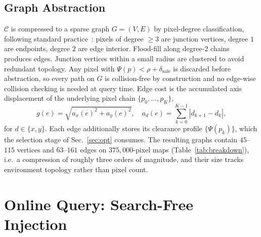\documentclass[conference]{IEEEtran}
\begin{document}
\subsection{Graph Abstraction}
$\mathcal{C}$ is compressed to a sparse graph $G=(V,E)$ by pixel-degree classification, following standard practice~\cite{qi2025egvg,lau2013}: pixels of degree $\ge 3$ are junction vertices, degree $1$ are endpoints, degree $2$ are edge interior. Flood-fill along degree-$2$ chains produces edges. Junction vertices within a small radius are clustered to avoid redundant topology. Any pixel with $\Psi(p)<\rho+\delta_{\mathrm{safe}}$ is discarded before abstraction, so every path on $G$ is collision-free by construction and no edge-wise collision checking is needed at query time.
Edge cost is the accumulated axis displacement of the underlying pixel chain $\{p_0,\dots,p_K\}$,
\begin{equation}
g(e)=\sqrt{a_x(e)^2+a_y(e)^2},\quad a_d(e)=\!\!\sum_{k=0}^{K-1}\!\!|d_{k+1}-d_k| ,
\end{equation}
for $d\in\{x,y\}$. Each edge additionally stores its clearance profile $\{\Psi(p_k)\}$, which the selection stage of Sec.~\ref{sec:opt} consumes.
The resulting graphs contain $45$--$115$ vertices and $63$--$161$ edges on $375{,}000$-pixel maps (Table~\ref{tab:breakdown}), i.e.\ a compression of roughly three orders of magnitude, and their size tracks environment topology rather than pixel count.
\section{Online Query: Search-Free Injection}
\label{sec:online}
\end{document}
